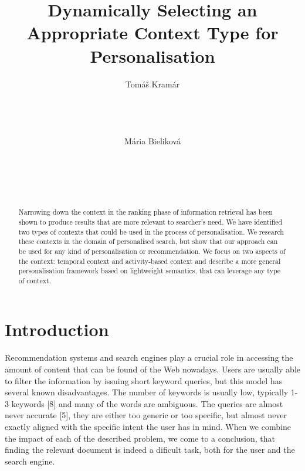 \documentclass{sig-alternate} %
\begin{document}
\title{Dynamically Selecting an Appropriate Context Type
for Personalisation}


\author{
\alignauthor
Tomáš Kramár\\
       \\
       \\
       \\
       \\
\alignauthor
Mária Bieliková\\
       \\
       \\
       \\
       \\
}

\maketitle

\begin{abstract}
Narrowing down the context in the ranking phase of information 
retrieval has been shown to produce results that are
more relevant to searcher's need. We have identified two
types of contexts that could be used in the process of personalisation. 
We research these contexts in the domain of
personalised search, but show that our approach can be used
for any kind of personalisation or recommendation. We focus on 
two aspects of the context: temporal context and
activity-based context and describe a more general personalisation 
framework based on lightweight semantics, that can
leverage any type of context.

\end{abstract}

\category{H.3.3}{[Information Search and Retrieval}{Information filtering}



\section{Introduction}

Recommendation systems and search engines play a crucial 
role in accessing the amount of content that can be
found of the Web nowadays. Users are usually able to filter 
the information by issuing short keyword queries, but
this model has several known disadvantages. The number
of keywords is usually low, typically 1-3 keywords [8] and
many of the words are ambiguous. The queries are almost
never accurate [5], they are either too generic or too specific,
but almost never exactly aligned with the specific intent the
user has in mind. When we combine the impact of each of
the described problem, we come to a conclusion, that finding
the relevant document is indeed a dificult task, both for the
user and the search engine.
\end{document}
